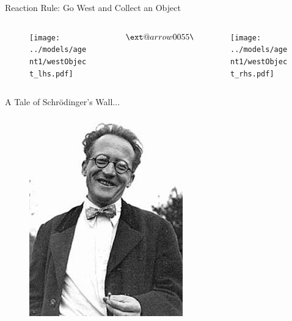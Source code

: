 \documentclass{beamer}
\makeatletter
\providecommand\longrightarrowRHD{\relbar\joinrel\relbar\joinrel\mathrel\RHD}
\providecommand*\xrightarrowRHD[2][]{\ext@arrow 0055{\arrowfill@\relbar\relbar\longrightarrowRHD}{#1}{#2}}
\makeatother
\begin{document}
\begin{frame}{Reaction Rule: Go West and Collect an Object}
  \begin{columns}
    \begin{column}{0.45\textwidth}
      \begin{figure}
        \centering
        \texttt{[image: ../models/agent1/westObject\_lhs.pdf]}
      \end{figure}
    \end{column}
    \begin{column}{0.1\textwidth}
      $\xrightarrowRHD{p}$
    \end{column}
    \begin{column}{0.45\textwidth}
      \begin{figure}
        \centering
        \texttt{[image: ../models/agent1/westObject\_rhs.pdf]}
      \end{figure}
    \end{column}
  \end{columns}
\end{frame}

\begin{frame}{A Tale of Schr\"{o}dinger's Wall...}
  \begin{figure}
    \centering
    \includegraphics[height=\textheight]{schrodinger.jpg}
  \end{figure}
\end{frame}
\end{document}
